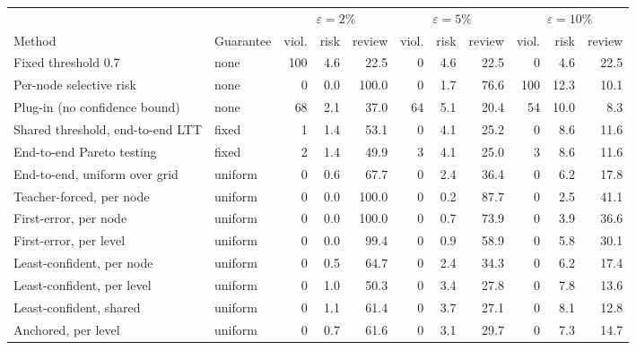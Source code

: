 \begin{tabular}{llrrrrrrrrr}
\toprule
 & & \multicolumn{3}{c}{$\varepsilon=2\%$} & \multicolumn{3}{c}{$\varepsilon=5\%$} & \multicolumn{3}{c}{$\varepsilon=10\%$} \\
\cmidrule(lr){3-5}\cmidrule(lr){6-8}\cmidrule(lr){9-11}
Method & Guarantee & viol. & risk & review & viol. & risk & review & viol. & risk & review \\
\midrule
Fixed threshold 0.7 & none & 100 & 4.6 & 22.5 & 0 & 4.6 & 22.5 & 0 & 4.6 & 22.5 \\
Per-node selective risk & none & 0 & 0.0 & 100.0 & 0 & 1.7 & 76.6 & 100 & 12.3 & 10.1 \\
Plug-in (no confidence bound) & none & 68 & 2.1 & 37.0 & 64 & 5.1 & 20.4 & 54 & 10.0 & 8.3 \\
\midrule
Shared threshold, end-to-end LTT & fixed & 1 & 1.4 & 53.1 & 0 & 4.1 & 25.2 & 0 & 8.6 & 11.6 \\
End-to-end Pareto testing & fixed & 2 & 1.4 & 49.9 & 3 & 4.1 & 25.0 & 3 & 8.6 & 11.6 \\
End-to-end, uniform over grid & uniform & 0 & 0.6 & 67.7 & 0 & 2.4 & 36.4 & 0 & 6.2 & 17.8 \\
\midrule
Teacher-forced, per node & uniform & 0 & 0.0 & 100.0 & 0 & 0.2 & 87.7 & 0 & 2.5 & 41.1 \\
First-error, per node & uniform & 0 & 0.0 & 100.0 & 0 & 0.7 & 73.9 & 0 & 3.9 & 36.6 \\
First-error, per level & uniform & 0 & 0.0 & 99.4 & 0 & 0.9 & 58.9 & 0 & 5.8 & 30.1 \\
\midrule
Least-confident, per node & uniform & 0 & 0.5 & 64.7 & 0 & 2.4 & 34.3 & 0 & 6.2 & 17.4 \\
Least-confident, per level & uniform & 0 & 1.0 & 50.3 & 0 & 3.4 & 27.8 & 0 & 7.8 & 13.6 \\
Least-confident, shared & uniform & 0 & 1.1 & 61.4 & 0 & 3.7 & 27.1 & 0 & 8.1 & 12.8 \\
Anchored, per level & uniform & 0 & 0.7 & 61.6 & 0 & 3.1 & 29.7 & 0 & 7.3 & 14.7 \\
\bottomrule
\end{tabular}
